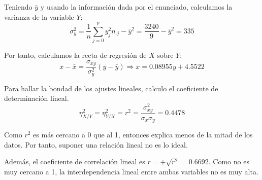 \begin{ejercicio}
    Teniendo $\bar{y}$ y usando la información dada por el enunciado, calculamos la varianza de la variable $Y$:
    \begin{equation*}
        \sigma_y^2 = \frac{1}{n}\sum_{j=0}^p y_j^2 n_{.j} - \bar{y}^2 = \frac{3240}{9} - \bar{y}^2 = 335
    \end{equation*}

    Por tanto, calculamos la recta de regresión de $X$ sobre $Y$:
    \begin{equation*}
        x-\bar{x} = \frac{\sigma_{xy}}{\sigma_y^2} (y-\bar{y}) \Longrightarrow x=0.08955y+4.5522
    \end{equation*}

    Para hallar la bondad de los ajustes lineales, calculo el coeficiente de determinación lineal.
    \begin{equation*}
        \eta_{X/Y}^2 = \eta_{Y/X}^2 = r^2 = \frac{\sigma_{xy}^2}{\sigma_x \sigma_y} = 0.4478
    \end{equation*}

    Como $r^2$ es más cercano a 0 que al 1, entonces explica menos de la mitad de los datos. Por tanto, suponer una relación lineal no es lo ideal.

    Además, el coeficiente de correlación lineal es $r=+\sqrt{r^2} = 0.6692$. Como no es muy cercano a 1, la interdependencia lineal entre ambas variables no es muy alta.
\end{ejercicio}

